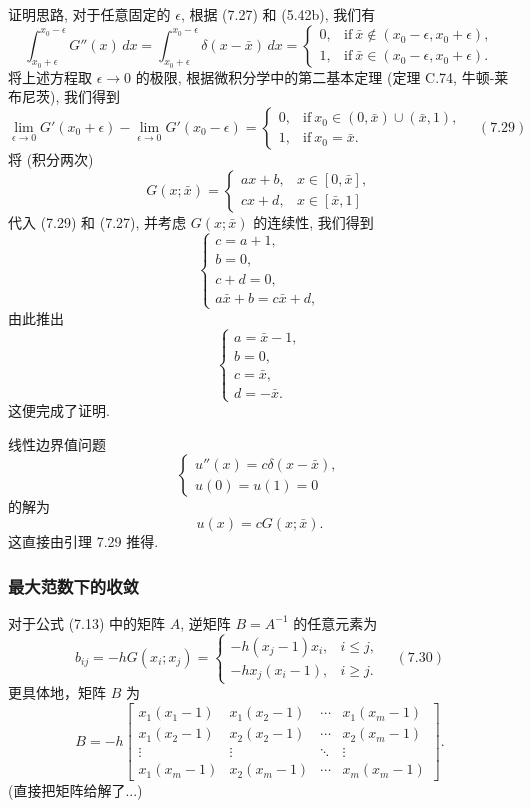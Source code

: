 \documentclass[a4paper]{ctexart}
\newcommand{\hl}[1]
{\noindent {\bf {#1}}}
\begin{document}
{证明思路, 对于任意固定的 $\epsilon$, 根据 (7.27) 和 (5.42b), 我们有
$$
\int_{x_0 + \epsilon}^{x_0 - \epsilon} G''(x) \, dx 
= \int_{x_0 + \epsilon}^{x_0 - \epsilon} \delta(x - \bar{x}) \, dx = 
\begin{cases}
0, & \text{if} \ \bar{x} \notin (x_0 - \epsilon, x_0 + \epsilon), \\
1, & \text{if} \ \bar{x} \in (x_0 - \epsilon, x_0 + \epsilon).
\end{cases}
$$
将上述方程取 $\epsilon \to 0$ 的极限, 根据微积分学中的第二基本定理 
(定理 C.74, 牛顿-莱布尼茨), 我们得到
$$
\lim_{\epsilon \to 0} G'(x_0 + \epsilon) - \lim_{\epsilon \to 0} 
G'(x_0 - \epsilon) = \begin{cases}
0, & \text{if} \ x_0 \in (0, \bar{x}) \cup (\bar{x}, 1), \\
1, & \text{if} \ x_0 = \bar{x}.
\end{cases} \quad (7.29)
$$
将 (积分两次)
$$
G(x; \bar{x}) = \begin{cases} 
  ax + b, & x \in [0, \bar{x}], \\
  cx + d, & x \in [\bar{x}, 1] \end{cases}
$$ 
代入 (7.29) 和 (7.27), 并考虑 $G(x; \bar{x})$ 的连续性, 我们得到
$$
\begin{cases}
c = a + 1, \\
b = 0, \\
c + d = 0, \\
a\bar{x} + b = c\bar{x} + d,
\end{cases}
$$
由此推出
$$
\begin{cases}
a = \bar{x} - 1, \\
b = 0, \\
c = \bar{x}, \\
d = -\bar{x}.
\end{cases}
$$
这便完成了证明. 

\hl{推论 7.30} 线性边界值问题
$$
\begin{cases}
u''(x) = c\delta(x - \bar{x}), \\
u(0) = u(1) = 0
\end{cases}
$$
的解为
$$
u(x) = cG(x; \bar{x}).
$$
这直接由引理 7.29 推得.

\subsubsection{最大范数下的收敛}

\hl{引理 7.31} 对于公式 (7.13) 中的矩阵 $A$, 逆矩阵 $B = A^{-1}$ 的任意元素为
$$
b_{ij} = -hG(x_i; x_j) = \begin{cases}
-h(x_j - 1)x_i, & i \leq j, \\
-hx_j(x_i - 1), & i \geq j.
\end{cases} \quad (7.30)
$$
更具体地，矩阵 $B$ 为
$$
B = -h \begin{bmatrix}
x_1(x_1 - 1) & x_1(x_2 - 1) & \cdots & x_1(x_m - 1) \\
x_1(x_2 - 1) & x_2(x_2 - 1) & \cdots & x_2(x_m - 1) \\
\vdots & \vdots & \ddots & \vdots \\
x_1(x_m - 1) & x_2(x_m - 1) & \cdots & x_m(x_m - 1)
\end{bmatrix}.
$$
(直接把矩阵给解了...)

}
\end{document}
